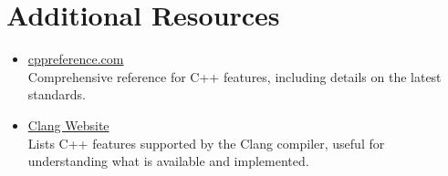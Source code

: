 \documentclass{article}
\begin{document}
\section*{Additional Resources}
\begin{itemize}
    \item \href{https://en.cppreference.com/w/}{cppreference.com} \\
    Comprehensive reference for C++ features, including details on the latest standards.
    
    \item \href{https://clang.llvm.org/}{Clang Website} \\
    Lists C++ features supported by the Clang compiler, useful for understanding what is available and implemented.
\end{itemize}
\end{document}
